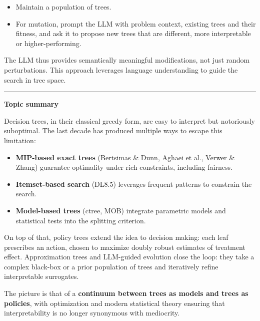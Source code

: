 \documentclass[a5paper]{article}
\providecommand{\tightlist}{%
  \setlength{\itemsep}{0pt}\setlength{\parskip}{0pt}}
\def\subsection#1{{\par\bigskip\goodbreak\large\bfseries #1\par}}
\begin{document}
\begin{itemize}
\tightlist
\item
  Maintain a population of trees.
\item
  For mutation, prompt the LLM with problem context, existing trees and
  their fitness, and ask it to propose new trees that are different,
  more interpretable or higher-performing.
\end{itemize}

The LLM thus provides semantically meaningful modifications, not just
random perturbations. This approach leverages language understanding to
guide the search in tree space.

\begin{center}\rule{0.5\linewidth}{0.5pt}\end{center}

\subsection{Topic summary}\label{topic-summary-12}

Decision trees, in their classical greedy form, are easy to interpret
but notoriously suboptimal. The last decade has produced multiple ways
to escape this limitation:

\begin{itemize}
\tightlist
\item
  \textbf{MIP-based exact trees} (Bertsimas \& Dunn, Aghaei et al.,
  Verwer \& Zhang) guarantee optimality under rich constraints,
  including fairness.
\item
  \textbf{Itemset-based search} (DL8.5) leverages frequent patterns to
  constrain the search.
\item
  \textbf{Model-based trees} (ctree, MOB) integrate parametric models
  and statistical tests into the splitting criterion.
\end{itemize}

On top of that, policy trees extend the idea to decision making: each
leaf prescribes an action, chosen to maximize doubly robust estimates of
treatment effect. Approximation trees and LLM-guided evolution close the
loop: they take a complex black-box or a prior population of trees and
iteratively refine interpretable surrogates.

The picture is that of a \textbf{continuum between trees as models and
trees as policies}, with optimization and modern statistical theory
ensuring that interpretability is no longer synonymous with mediocrity.
\end{document}
